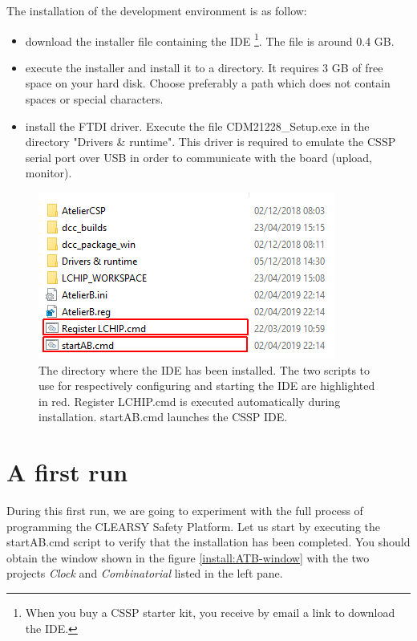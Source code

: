 The installation of the development environment is as follow:
\begin{itemize}
    \item download the installer file containing the IDE \footnote{When you buy a CSSP starter kit, you receive by email a link to download the IDE.}. The file is around 0.4 GB. 
    \item execute the installer and install it to a directory. It requires 3 GB of free space on your hard disk.  Choose preferably a path which does not contain spaces or special characters. 
        \item install the FTDI driver. Execute the file CDM21228\_Setup.exe in the directory "Drivers \& runtime". This driver is required to emulate the CSSP serial port over USB in order to communicate with the board (upload, monitor).
\end{itemize}  

\begin{figure}[ht]
\centering\includegraphics[scale=0.5]{Pictures/chapterProgramming/INSTALL-directory.png}
\caption{The directory where the IDE has been installed. The two scripts to use for respectively configuring and starting the IDE are highlighted in red. Register LCHIP.cmd is executed automatically during installation. startAB.cmd launches the CSSP IDE.}
\label{install:directory}
\end{figure}



\section{A first run}
During this first run, we are going to experiment with the full process of programming the CLEARSY Safety Platform. Let us start by executing the startAB.cmd script to verify that the installation has been completed. You should obtain the window shown in the figure \ref{install:ATB-window} with the two projects \textit{Clock} and \textit{Combinatorial} listed in the left pane.

